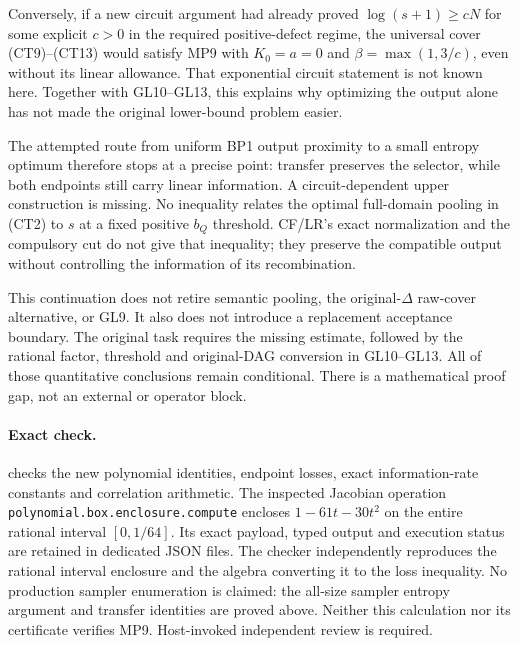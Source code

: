 \documentclass[11pt]{article}
\begin{document}
Conversely, if a new circuit argument had already proved
$\log(s+1)\ge cN$ for some explicit $c>0$ in the required
positive-defect regime, the universal cover (CT9)--(CT13) would
satisfy MP9 with $K_0=a=0$ and $\beta=\max(1,3/c)$, even
without its linear allowance. That exponential circuit statement
is not known here. Together with GL10--GL13, this explains why
optimizing the output alone has not made the original lower-bound
problem easier.

The attempted route from uniform BP1 output proximity to a small
entropy optimum therefore stops at a precise point: transfer
preserves the selector, while both endpoints still carry linear
information. A circuit-dependent upper construction is missing.
No inequality relates the optimal full-domain pooling in (CT2)
to $s$ at a fixed positive $b_Q$ threshold. CF/LR's exact
normalization and the compulsory cut do not give that inequality;
they preserve the compatible output without controlling the
information of its recombination.

This continuation does not retire semantic pooling, the
original-$\Delta$ raw-cover alternative, or GL9. It also does not
introduce a replacement acceptance boundary. The original task
requires the missing estimate, followed by the rational factor,
threshold and original-DAG conversion in GL10--GL13.
All of those quantitative conclusions remain conditional.
There is a mathematical proof gap, not an external or operator block.

\paragraph{Exact check.}
 checks the new
polynomial identities, endpoint losses, exact information-rate
constants and correlation arithmetic. The inspected Jacobian
operation \texttt{polynomial.box.enclosure.compute} encloses
$1-61t-30t^2$ on the entire rational interval $[0,1/64]$.
Its exact payload, typed output and execution status are retained
in dedicated JSON files. The checker independently reproduces
the rational interval enclosure and the algebra converting it
to the loss inequality. No production sampler enumeration is
claimed: the all-size sampler entropy argument and transfer
identities are proved above. Neither this calculation nor its
certificate verifies MP9. Host-invoked independent review is required.
\end{document}
